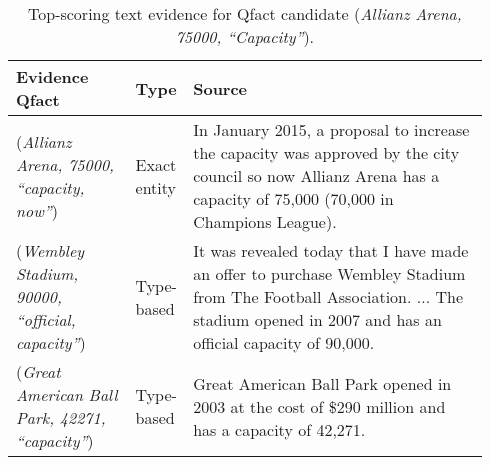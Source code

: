 \begin{table*}[t]
	\caption{Top-scoring text evidence for Qfact candidate (\textit{Allianz Arena, 75000, ``Capacity''}).}	
	\footnotesize	
	\vspace{\tsq}
	\begin{tabular}{p{0.25\linewidth}|p{0.07\linewidth}|p{0.62\linewidth}} 	 
				    \hline
		Evidence Qfact & Type & Source \\    \hline
		(\textit{Allianz Arena, 75000, ``capacity, now''}) & Exact entity & In January 2015, a proposal to increase the capacity was approved by the city council so now Allianz Arena has a capacity of 75,000 (70,000 in Champions League). \\ 
		(\textit{Wembley Stadium, 90000, ``official, capacity''}) & Type-based & It was revealed today that I have made an offer to purchase Wembley Stadium from The Football Association. ... The stadium opened in 2007 and has an official capacity of 90,000. \\
		(\textit{Great American Ball Park, 42271, ``capacity''}) & Type-based & Great American Ball Park opened in 2003 at the cost of \$290 million and has a capacity of 42,271.\\

			    \hline
	\end{tabular}	
	\label{table:example_ext_items}
\end{table*}